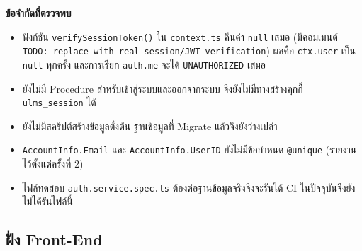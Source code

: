 \noindent\textbf{ข้อจำกัดที่ตรวจพบ}

\begin{itemize}
  \item ฟังก์ชัน \texttt{verifySessionToken()} ใน \texttt{context.ts} คืนค่า \texttt{null} เสมอ (มีคอมเมนต์ \texttt{TODO: replace with real session/JWT verification}) ผลคือ \texttt{ctx.user} เป็น \texttt{null} ทุกครั้ง และการเรียก \texttt{auth.me} จะได้ \texttt{UNAUTHORIZED} เสมอ
  \item ยังไม่มี Procedure สำหรับเข้าสู่ระบบและออกจากระบบ จึงยังไม่มีทางสร้างคุกกี้ \texttt{ulms\_session} ได้
  \item ยังไม่มีสคริปต์สร้างข้อมูลตั้งต้น ฐานข้อมูลที่ Migrate แล้วจึงยังว่างเปล่า
  \item \texttt{AccountInfo.Email} และ \texttt{AccountInfo.UserID} ยังไม่มีข้อกำหนด \texttt{@unique} (รายงานไว้ตั้งแต่ครั้งที่ 2)
  \item ไฟล์ทดสอบ \texttt{auth.service.spec.ts} ต้องต่อฐานข้อมูลจริงจึงจะรันได้ CI ในปัจจุบันจึงยังไม่ได้รันไฟล์นี้
\end{itemize}

\subsection{ฝั่ง Front-End}

